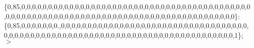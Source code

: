 \{0,85,0,0,0,0,0,0,0,0,0,0,0,0,0,0,0,0,0,0,0,0,0,0,0,0,0,0,0,0,0,0,0,0,0,0,0,0,0,0,0,0,0,0,0,0,0,0,0,0,0,0,0,0,0,0,0,0,0,0,0,0,0,0,0,0,0,0,0,0,0,0,0,0,0,0,0,0,0,0,0,0,0,0,0,0,0,0\}\+: \{0,85,0,0,0,0,0,0,0.,0,0,0,0,0,0,0,0,0,0,0,0,0,0,0,0,0,0,0,0,0,0,0,0,0,0,0,0,0,0,0,0,0,0,0,0,0,0,0,0,0,0,0,0,0,0,0,0,0,0,0,0,0,0,0,0,0,0,0,0,0,0,0,0,0,0,0,0,0,0,0,0,0,0,0,0,0,0,1\}; $>$ 